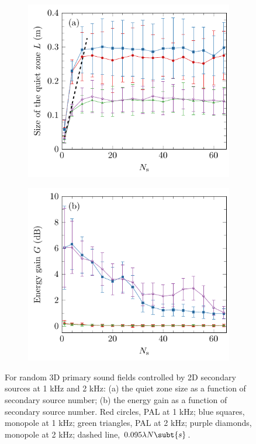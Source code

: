 \begin{figure}[!htb]
    \centering
    \begin{subfigure}{0.49\textwidth}
        \centering
        \includegraphics[width = \textwidth]{fig/200410A_size_v2}
    \end{subfigure}
    \begin{subfigure}{0.49\textwidth}
        \centering
        \includegraphics[width = \textwidth]{fig/200410A_gain_v2}
    \end{subfigure}
    \caption{For random 3D primary sound fields controlled by 2D secondary sources at 1 kHz and 2 kHz: (a) the quiet zone size as a function of secondary source number; (b) the energy gain as a function of secondary source number. Red circles, PAL at 1 kHz; blue squares, monopole at 1 kHz; green triangles, PAL at 2 kHz; purple diamonds, monopole at 2 kHz; dashed line, $0.095\lambda N\subt{s}$.}
    \label{fig:ancpalqz:qz_eg:rand:3dpri:2dsec}
\end{figure}

